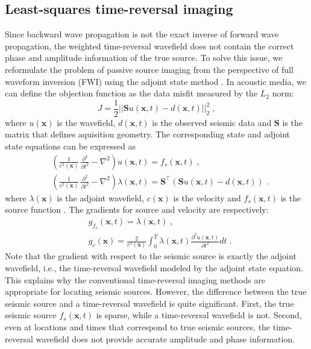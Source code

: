 \subsection{Least-squares time-reversal imaging}
Since backward wave propagation is not the exact inverse of forward wave propagation, the weighted time-reversal wavefield does not contain the correct phase and amplitude information of the true source. To solve this issue, we reformulate the problem of passive source imaging from the perspective of full waveform inversion (FWI) using the adjoint state method \cite[]{plessix06,virieux09}. In acoustic media, we can define the objection function as the data misfit measured by the $L_2$ norm:
\begin{equation}
    \label{eq:obj}
    J = \frac{1}{2}|| \mathbf{S}u(\mathbf{x},t) - d(\mathbf{x},t) ||_2^2 \;,
\end{equation}
where $u(\mathbf{x})$ is the wavefield, $d(\mathbf{x},t)$ is the observed seismic data and $\mathbf{S}$ is the matrix that defines aquisition geometry. The corresponding state and adjoint state equations can be expressed as
\begin{align}
    \label{eq:state}
    &(\frac{1}{c^2(\mathbf{x})}\,\frac{\partial^2}{\partial t^2} - \nabla^2) u(\mathbf{x},t) = f_s(\mathbf{x},t)\;, \\
    \label{eq:adjstate}
    &(\frac{1}{c^2(\mathbf{x})}\,\frac{\partial^2}{\partial t^2} - \nabla^2) \lambda(\mathbf{x},t) = \mathbf{S}^{\intercal}(\mathbf{S}u(\mathbf{x},t) - d(\mathbf{x},t))\;.
\end{align}
where $\lambda(\mathbf{x})$ is the adjoint wavefield, $c(\mathbf{x})$ is the velocity and $f_s(\mathbf{x},t)$ is the source function . The gradients for source and velocity are respectively:
\begin{align}
    \label{eq:gradf}
    & g_{f_s}(\mathbf{x},t) = \lambda(\mathbf{x},t) \;, \\ 
    \label{eq:gradc}
    & g_c(\mathbf{x}) = \frac{2}{c^3(\mathbf{x})} \int_0^T \lambda(\mathbf{x},t) \frac{\partial^2u(\mathbf{x},t)}{\partial t^2} dt \;.
\end{align}
Note that the gradient with respect to the seismic source is exactly the adjoint wavefield, i.e., the time-reversal wavefield modeled by the adjoint state equation. This explains why the conventional time-reversal imaging methods are appropriate for locating seismic sources. However, the difference between the true seismic source and a time-reversal wavefield is quite significant. First, the true seismic source $f_s(\mathbf{x},t)$ is sparse, while a time-reversal wavefield is not. Second, even at locations and times that correspond to true seismic sources, the time-reversal wavefield does not provide accurate amplitude and phase information.

